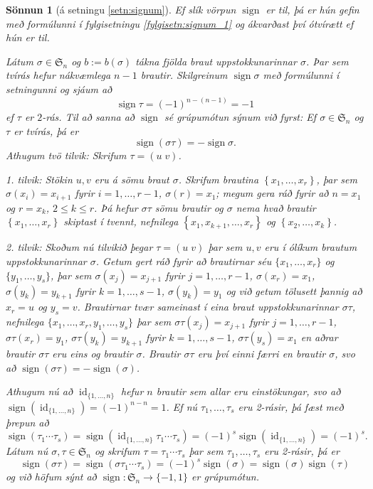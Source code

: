 \documentclass[a4paper,icelandic,11pt]{book}
\theoremstyle{plain}
\newtheorem*{sonnun}{Sönnun}
\DeclareMathOperator{\id}{id} %
\DeclareMathOperator{\sign}{sign} %
\begin{document}
\begin{sonnun}
  [á setningu \ref{setn:signum}]
  Ef slík vörpun $\sign$ er til, þá er hún gefin með formúlunni í fylgisetningu
  \ref{fylgisetn:signum_1} og ákvarðast því ótvírætt ef hún er til.

  Látum $\sigma\in \mathfrak S_n$ og $b := b(\sigma)$ tákna fjölda braut
  uppstokkunarinnar $\sigma$. Þar sem tvírás hefur nákvæmlega $n-1$ brautir.
  Skilgreinum $\sign\sigma$ með formúlunni í setningunni og sjáum að 
 \[
 \sign\tau = (-1)^{n-(n-1)} = -1
 \]
 ef $\tau$ er $2$-rás. Til að sanna að $\sign$ sé grúpumótun sýnum við fyrst: Ef
 $\sigma\in\mathfrak S_n$ og $\tau$ er tvírás, þá er
\[
\sign(\sigma\tau) = -\sign\sigma.
\]
Athugum tvö tilvik: Skrifum $\tau = (u\;v)$.

\emph{1. tilvik:} Stökin $u,v$ eru á sömu braut $\sigma$. Skrifum brautina
$\left\{ x_1,\dots,x_r \right\}$, þar sem $\sigma(x_i) = x_{i+1}$ fyrir
$i=1,\dots,r-1$, $\sigma(r) = x_1$; megum gera ráð fyrir að $n = x_1$ og
$r = x_k$, $2\le k \le r$. Þá hefur $\sigma\tau$ sömu brautir og $\sigma$ nema
hvað brautir $\left\{ x_1,\dots,x_r \right\}$ skiptast í tvennt, nefnilega
$\left\{ x_1,x_{k+1},\dots,x_r \right\}$ og $\left\{ x_2,\dots,x_k \right\}$.


\emph{2. tilvik:} Skoðum nú tilvikið þegar $\tau = (u\;v)$ þar sem $u,v$ eru í
ólíkum brautum uppstokkunarinnar $\sigma$. Getum gert ráð fyrir að brautirnar
séu $\{x_1,\dots,x_r \}$ og $\{y_1, \dots,y_s\}$, þar sem $\sigma(x_j) =
x_{j+1}$ fyrir $j = 1,\dots,r-1$, $\sigma(x_r) = x_1$, $\sigma(y_k) = y_{k+1}$
fyrir $k = 1,\dots,s-1$, $\sigma(y_k)= y_1$ og við getum tölusett þannig að
$x_r = u$ og $y_s = v$. Brautirnar tvær sameinast í eina braut
uppstokkunarinnar $\sigma\tau$, nefnilega $\{x_1,\dots,x_r,y_1,\dots,y_s\}$
þar sem $\sigma\tau(x_j) = x_{j+1}$ fyrir $j=1,\dots,r-1$, $\sigma\tau(x_r) =
y_1$, $\sigma\tau(y_k) = y_{k+1}$ fyrir $k = 1,\dots,s-1$, $\sigma\tau(y_s) =
x_1$ en aðrar brautir $\sigma\tau$ eru eins og brautir $\sigma$. Brautir
$\sigma\tau$ eru því einni færri en brautir $\sigma$, svo að
$\sign(\sigma\tau) = -\sign(\sigma)$.

Athugum nú að $\id_{\{1,\dots,n\}} $ hefur $n$ brautir sem allar eru
einstökungar, svo að $\sign(\id_{\{1,\dots,n\}}) = (-1)^{n-n} = 1$. Ef nú
$\tau_1,\dots,\tau_s$ eru 2-rásir, þá fæst með þrepun að
\[
\sign(\tau_1\cdots\tau_s)
= \sign(\id_{\{1,\dots,n \}} \tau_1\cdots\tau_s) 
= (-1)^s \sign(\id_{\{1,\dots,n\}}) 
= (-1)^s.
\]
Látum nú $\sigma ,\tau\in\mathfrak S_n$ og skrifum $\tau = \tau_1\cdots\tau_s$
þar sem $\tau_1,\dots,\tau_s$ eru 2-rásir, þá er
\[
  \sign(\sigma\tau) 
  = \sign(\sigma\tau_1\cdots\tau_s)
  = (-1)^s\sign(\sigma)
  = \sign(\sigma)\sign(\tau)
\]
og við höfum sýnt að $\sign:\mathfrak S_n\to \{-1,1\}$ er grúpumótun.
\end{sonnun}
\end{document}
